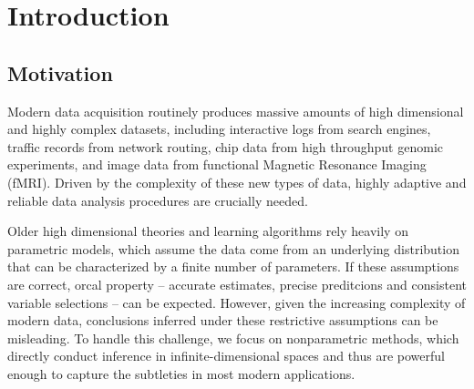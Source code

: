 \section{Introduction}

\subsection{Motivation}

Modern data acquisition routinely produces massive amounts of high dimensional and highly complex datasets, including interactive logs from search engines, traffic records from network routing, chip data from high throughput genomic experiments, and image data from functional Magnetic Resonance Imaging (fMRI). 
Driven by the complexity of these new types of data, highly adaptive and reliable data analysis procedures are crucially needed. 

Older high dimensional theories and learning algorithms rely heavily on parametric models, which assume the data come from an underlying distribution that can be characterized by a finite number of parameters. 
If these assumptions are correct, orcal property -- accurate estimates, precise preditcions and consistent variable selections \citep{fan2010selective} -- can be expected. 
However, given the increasing complexity of modern data, conclusions inferred under these restrictive assumptions can be misleading. 
To handle this challenge, we focus on nonparametric methods, which directly conduct inference in infinite-dimensional spaces and thus are powerful enough to capture the subtleties in most modern applications.
